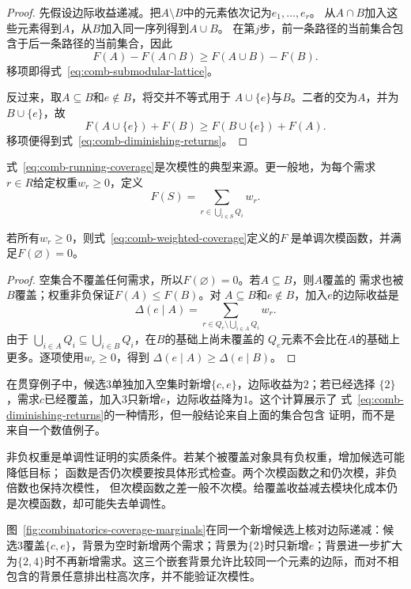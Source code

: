 \begin{proof}
先假设边际收益递减。把$A\setminus B$中的元素依次记为$e_1,\ldots,e_r$。
从$A\cap B$加入这些元素得到$A$，从$B$加入同一序列得到$A\cup B$。
在第$j$步，前一条路径的当前集合包含于后一条路径的当前集合，因此
\[
  F(A)-F(A\cap B)
  \geq F(A\cup B)-F(B).
\]
移项即得式~\eqref{eq:comb-submodular-lattice}。

反过来，取$A\subseteq B$和$e\notin B$，将交并不等式用于
$A\cup\{e\}$与$B$。二者的交为$A$，并为$B\cup\{e\}$，故
\[
  F(A\cup\{e\})+F(B)
  \geq F(B\cup\{e\})+F(A).
\]
移项便得到式~\eqref{eq:comb-diminishing-returns}。
\end{proof}

式~\eqref{eq:comb-running-coverage}是次模性的典型来源。更一般地，为每个需求
$r\in R$给定权重$w_r\geq0$，定义
\begin{equation}
  F(S)
  =
  \sum_{r\in\bigcup_{i\in S}Q_i}w_r.
  \label{eq:comb-weighted-coverage}
\end{equation}

\begin{theorem}[非负加权覆盖函数单调且次模]
\label{thm:comb-coverage-submodular}
若所有$w_r\geq0$，则式~\eqref{eq:comb-weighted-coverage}定义的$F$
是单调次模函数，并满足$F(\varnothing)=0$。
\end{theorem}

\begin{proof}
空集合不覆盖任何需求，所以$F(\varnothing)=0$。若$A\subseteq B$，则$A$覆盖的
需求也被$B$覆盖；权重非负保证$F(A)\leq F(B)$。对
$A\subseteq B$和$e\notin B$，加入$e$的边际收益是
\[
  \Delta(e\mid A)
  =
  \sum_{r\in Q_e\setminus\bigcup_{i\in A}Q_i}w_r.
\]
由于
$\bigcup_{i\in A}Q_i\subseteq\bigcup_{i\in B}Q_i$，在$B$的基础上尚未覆盖的
$Q_e$元素不会比在$A$的基础上更多。逐项使用$w_r\geq0$，得到
$\Delta(e\mid A)\geq\Delta(e\mid B)$。
\end{proof}

在贯穿例子中，候选$3$单独加入空集时新增$\{c,e\}$，边际收益为$2$；若已经选择
$\{2\}$，需求$c$已经覆盖，加入$3$只新增$e$，边际收益降为$1$。这个计算展示了
式~\eqref{eq:comb-diminishing-returns}的一种情形，但一般结论来自上面的集合包含
证明，而不是来自一个数值例子。

非负权重是单调性证明的实质条件。若某个被覆盖对象具有负权重，增加候选可能降低目标；
函数是否仍次模要按具体形式检查。两个次模函数之和仍次模，非负倍数也保持次模性，
但次模函数之差一般不次模。给覆盖收益减去模块化成本仍是次模函数，却可能失去单调性。

图~\ref{fig:combinatorics-coverage-marginals}在同一个新增候选上核对边际递减：候选\(3\)覆盖\(\{c,e\}\)，背景为空时新增两个需求；背景为\(\{2\}\)时只新增\(e\)；背景进一步扩大为\(\{2,4\}\)时不再新增需求。这三个嵌套背景允许比较同一个元素的边际，而对不相包含的背景任意排出柱高次序，并不能验证次模性。


